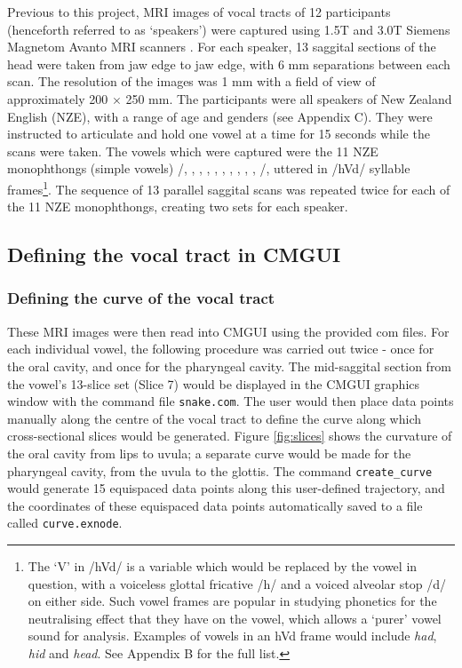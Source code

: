Previous to this project, MRI images of vocal tracts of 12 participants (henceforth referred to as `speakers') were captured using 1.5T and 3.0T Siemens Magnetom Avanto MRI scanners \cite{watson2014mappings}. For each speaker, 13 saggital sections of the head were taken from jaw edge to jaw edge, with 6 mm separations between each scan. The resolution of the images was 1 mm with a field of view of approximately 200 $\times$ 250 mm. The participants were all speakers of New Zealand English (NZE), with a range of age and genders (see Appendix C). They were instructed to articulate and hold one vowel at a time for 15 seconds while the scans were taken. The vowels which were captured were the 11 NZE monophthongs (simple vowels) /, , , , \textipa{\ae}, , , , , , /, uttered in /hVd/ syllable frames\footnote{The `V' in /hVd/ is a variable which would be replaced by the vowel in question, with a voiceless glottal fricative /h/ and a voiced alveolar stop /d/ on either side. Such vowel frames are popular in studying phonetics for the neutralising effect that they have on the vowel, which allows a `purer' vowel sound for analysis. Examples of vowels in an hVd frame would include \textit{had}, \textit{hid} and \textit{head}. See Appendix B for the full list.}. The sequence of 13 parallel saggital scans was repeated twice for each of the 11 NZE monophthongs, creating two sets for each speaker. 

\subsection{Defining the vocal tract in CMGUI}

\subsubsection{Defining the curve of the vocal tract}

These MRI images were then read into CMGUI using the provided com files. For each individual vowel, the following procedure was carried out twice - once for the oral cavity, and once for the pharyngeal cavity. The mid-saggital section from the vowel's 13-slice set (Slice 7) would be displayed in the CMGUI graphics window with the command file \verb|snake.com|. The user would then place data points manually along the centre of the vocal tract to define the curve along which cross-sectional slices would be generated. Figure \ref{fig:slices} shows the curvature of the oral cavity from lips to uvula; a separate curve would be made for the pharyngeal cavity, from the uvula to the glottis. The command \verb|create_curve| would generate 15 equispaced data points along this user-defined trajectory, and the coordinates of these equispaced data points automatically saved to a file called \verb|curve.exnode|.

